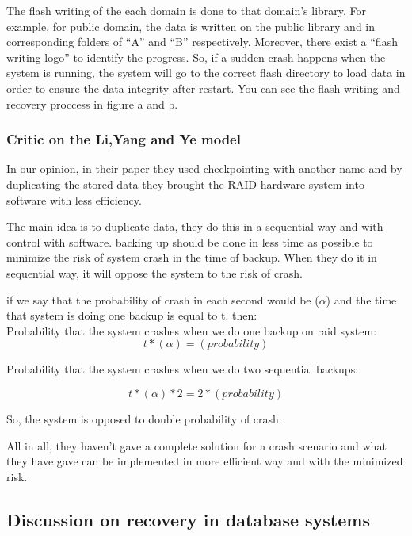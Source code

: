 \documentclass[10pt]{article} %
\begin{document}
The flash writing of the each domain is done to that domain’s library. For example, for  public domain, the data is written on the public library and in corresponding folders of “A” and “B” respectively. Moreover, there exist a “flash writing logo” to identify the progress. So, if a sudden crash happens when the system is running, the system will go to the correct flash directory to load data in order to ensure the data integrity after restart. You can see the flash writing and recovery proccess in figure a and b.

\subsubsection{Critic on the Li,Yang and Ye model}

In our opinion, in their paper they used checkpointing with another name and by duplicating the stored data they brought the RAID hardware system into software with less efficiency.

The main idea is to duplicate data, they do this in a sequential way and with control with software. backing up should be done in less time as possible to minimize the risk of system crash in the time of backup. When they do it in sequential way, it will oppose the system to the risk of crash.

if we say that the probability of crash in each second would be ($\alpha$) and the time that system is doing one backup is equal to t. then:\\

Probability that the system crashes when we do one backup on raid system:
\begin{equation}
 t*(\alpha) = (probability)
\end{equation}

Probability that the system crashes when we do two sequential backups:

\begin{equation}
 t*(\alpha)*2 = 2*(probability)
\end{equation}

So, the system is opposed to double probability of crash.

All in all, they haven’t gave a complete solution for a crash scenario and what they have gave can be implemented in more efficient way and with the minimized risk.

\subsection{ Discussion on recovery in database systems}
\end{document}
